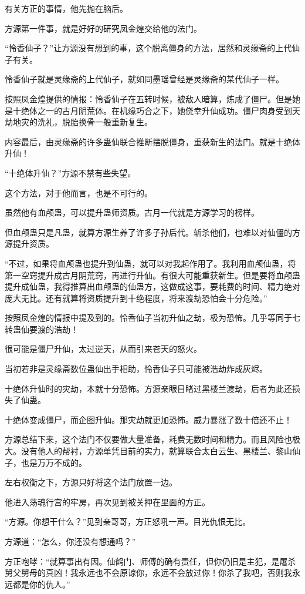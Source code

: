\begin{this_body}
有关方正的事情，他先抛在脑后。

方源第一件事，就是好好的研究凤金煌交给他的法门。

“怜香仙子？”让方源没有想到的事，这个脱离僵身的方法，居然和灵缘斋的上代仙子有关。

怜香仙子就是灵缘斋的上代仙子，就如同墨瑶曾经是灵缘斋的某代仙子一样。

按照凤金煌提供的情报：怜香仙子在五转时候，被敌人暗算，炼成了僵尸。但是她是十绝体之一的古月阴荒体。在机缘巧合之下，她侥幸升仙成功。僵尸肉身受到天劫地灾的洗礼，脱胎换骨一般重新复生。

内容最后，由灵缘斋的许多蛊仙联合推断摆脱僵身，重获新生的法门。就是十绝体升仙！

“十绝体升仙？”方源不禁有些失望。

这个方法，对于他而言，也是不可行的。

虽然他有血颅蛊，可以提升蛊师资质。古月一代就是方源学习的榜样。

但血颅蛊只是凡蛊，就算方源生养了许多子孙后代。斩杀他们，也难以对仙僵的方源提升资质。

“不过，如果将血颅蛊也提升到仙蛊，就可以对我起作用了。我利用血颅仙蛊，将第一空窍提升成古月阴荒窍，再进行升仙。有很大可能重获新生。但是要将血颅蛊提升成仙蛊，我得推算出血颅蛊的仙蛊方，这做成这事，要耗费的时间、精力绝对庞大无比。还有就算将资质提升到十绝程度，将来渡劫恐怕会十分危险。”

按照凤金煌的情报中提及到的。怜香仙子当初升仙之劫，极为恐怖。几乎等同于七转蛊仙要渡的浩劫！

很可能是僵尸升仙，太过逆天，从而引来苍天的怒火。

当初若非是灵缘斋数位蛊仙出手相助，怜香仙子只可能被浩劫炸成灰烬。

十绝体升仙时的灾劫，本就十分恐怖。方源亲眼目睹过黑楼兰渡劫，后者为此还损失了仙蛊。

十绝体变成僵尸，而企图升仙。那灾劫就更加恐怖。威力暴涨了数十倍还不止！

方源总结下来，这个法门不仅要做大量准备，耗费无数时间和精力。而且风险也极大。没有他人的帮衬，方源单凭目前的实力，就算联合太白云生、黑楼兰、黎山仙子，也是万万不成的。

左右权衡之下，方源只好将这个法门放置一边。

他进入荡魂行宫的牢房，再次见到被关押在里面的方正。

“方源。你想干什么？”见到亲哥哥，方正怒吼一声。目光仇恨无比。

方源道：“怎么，你还没有想通吗？”

方正咆哮：“就算事出有因。仙鹤门、师傅的确有责任，但你仍旧是主犯，是屠杀舅父舅母的真凶！我永远也不会原谅你，永远不会放过你！你杀了我吧，否则我永远都是你的仇人。”


\end{this_body}
